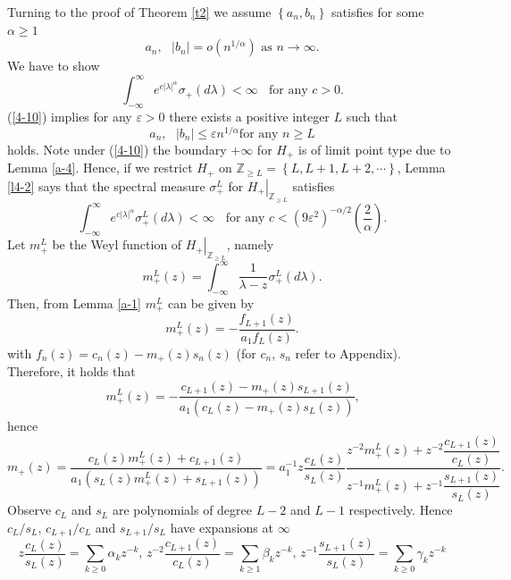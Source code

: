 \documentclass[a4paper]{article}%
\begin{document}
Turning to the proof of Theorem \ref{t2} we assume $\left\{  a_{n}%
,b_{n}\right\}  $ satisfies for some $\alpha\geq1$%
\[
a_{n},\text{ }\left\vert b_{n}\right\vert =o\left(  n^{1/\alpha}\right)
\text{ \ as }n\rightarrow\infty\text{.}%
\]
We have to show%
\[
\int_{-\infty}^{\infty}e^{c\left\vert \lambda\right\vert ^{\alpha}}\sigma
_{+}\left(  d\lambda\right)  <\infty\ \ \ \ \text{for any }c>0\text{.}%
\]
(\ref{4-10}) implies for any $\varepsilon>0$ there exists a positive integer
$L$ such that%
\[
a_{n},\text{ }\left\vert b_{n}\right\vert \leq\varepsilon n^{1/\alpha}\text{
\ for any }n\geq L
\]
holds. Note under (\ref{4-10}) the boundary $+\infty$ for $H_{+}$ is of limit
point type due to Lemma \ref{a-4}. Hence, if we restrict $H_{+}$ on
$\mathbb{Z}_{\geq L}=\left\{  L,L+1,L+2,\cdots\right\}  $, Lemma \ref{l4-2}
says that the spectral measure $\sigma_{+}^{L}$ for $\left.  H_{+}\right\vert
_{\mathbb{Z}_{\geq L}}$ satisfies%
\[
\int_{-\infty}^{\infty}e^{c\left\vert \lambda\right\vert ^{\alpha}}\sigma
_{+}^{L}\left(  d\lambda\right)  <\infty\ \ \ \ \text{for any }c<\left(
9\varepsilon^{2}\right)  ^{-\alpha/2}\left(  \dfrac{2}{\alpha}\right)
\text{.}%
\]
Let $m_{+}^{L}$ be the Weyl function of $\left.  H_{+}\right\vert
_{\mathbb{Z}_{\geq L}}$, namely%
\[
m_{+}^{L}\left(  z\right)  =\int_{-\infty}^{\infty}\dfrac{1}{\lambda-z}%
\sigma_{+}^{L}\left(  d\lambda\right)  \text{.}%
\]
Then, from Lemma \ref{a-1} $m_{+}^{L}$ can be given by%
\[
m_{+}^{L}\left(  z\right)  =-\dfrac{f_{L+1}(z)}{a_{1}f_{L}(z)}\text{.}%
\]
with $f_{n}(z)=c_{n}(z)-m_{+}\left(  z\right)  s_{n}(z)$ (for $c_{n}$, $s_{n}$
refer to Appendix). Therefore, it holds that%
\[
m_{+}^{L}\left(  z\right)  =-\dfrac{c_{L+1}(z)-m_{+}\left(  z\right)
s_{L+1}(z)}{a_{1}\left(  c_{L}(z)-m_{+}\left(  z\right)  s_{L}(z)\right)
}\text{,}%
\]
hence%
\begin{equation}
m_{+}\left(  z\right)  =\dfrac{c_{L}(z)m_{+}^{L}\left(  z\right)  +c_{L+1}%
(z)}{a_{1}\left(  s_{L}(z)m_{+}^{L}\left(  z\right)  +s_{L+1}(z)\right)
}=a_{1}^{-1}z\dfrac{c_{L}(z)}{s_{L}(z)}\dfrac{z^{-2}m_{+}^{L}\left(  z\right)
+z^{-2}\dfrac{c_{L+1}(z)}{c_{L}(z)}}{z^{-1}m_{+}^{L}\left(  z\right)
+z^{-1}\dfrac{s_{L+1}(z)}{s_{L}(z)}}\text{.} \label{4-12}%
\end{equation}
Observe $c_{L}$ and $s_{L}$ are polynomials of degree $L-2$ and $L-1$
respectively. Hence $c_{L}/s_{L}$, $c_{L+1}/c_{L}$ and $s_{L+1}/s_{L}$ have
expansions at $\infty$
\[
z\dfrac{c_{L}(z)}{s_{L}(z)}=\sum\limits_{k\geq0}\alpha_{k}z^{-k}\text{,
\ }z^{-2}\dfrac{c_{L+1}(z)}{c_{L}(z)}=\sum\limits_{k\geq1}\beta_{k}%
z^{-k}\text{, \ }z^{-1}\dfrac{s_{L+1}(z)}{s_{L}(z)}=\sum\limits_{k\geq0}%
\gamma_{k}z^{-k}%
\]
\end{document}

